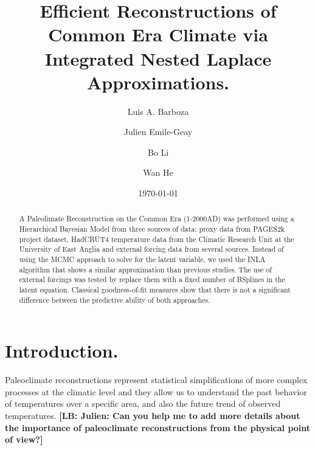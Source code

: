 \documentclass[11pt]{amsart}
\theoremstyle{plain}
\theoremstyle{definition}
\theoremstyle{remark}
\newcommand{\lb}[1]{\color{MidnightBlue}\textbf{[LB: #1]}\normalcolor}
\begin{document}
\title[Paleoclimate Reconstruction using INLA.]{Efficient Reconstructions of Common Era Climate via Integrated Nested Laplace Approximations.}

\author{Luis A. Barboza}
\address{Centro de Investigacion en Matematica Pura y Aplicada (CIMPA)-Escuela
  de Matematica, Universidad de Costa Rica\\
San Jos\'e, Costa Rica}


\author{Julien Emile-Geay}
\address{Department of Earth Sciences \\
  University of Southern California \\
  Los Angeles, California, USA.
}


\author{Bo Li}
\address{Department of Statistics \\
  University of Illinois at Urbana-Champaign \\
  Champaign, Illinois, USA.
}

\author{Wan He}


\date{\today}
\subjclass[2010]{}
\maketitle

\begin{abstract}
A Paleolimate Reconstruction on the Common Era (1-2000AD) was performed using a
Hierarchical Bayesian Model from three sources of data: proxy data from PAGES2k
project dataset, HadCRUT4 temperature data from the Climatic Research Unit
at the University of East Anglia and external forcing data from several sources.
Instead of using the MCMC approach to solve for the latent variable, we used the
INLA algorithm that shows a similar approximation than previous studies. The use
of external forcings was tested by replace them with a fixed number of
BSplines in the latent equation. Classical goodness-of-fit measures show that there is not a significant
difference between the predictive ability of both approaches. 
\end{abstract}

\section{Introduction.}
\label{sec:intro}

Paleoclimate reconstructions represent statistical simplifications of more
complex processes at the climatic level and they allow us to understand the past
behavior of temperatures over a specific area, and also the future trend of
observed temperatures. \lb{Julien: Can you help me to add more details about the
importance of paleoclimate reconstructions from the physical point of view?}
\end{document}
